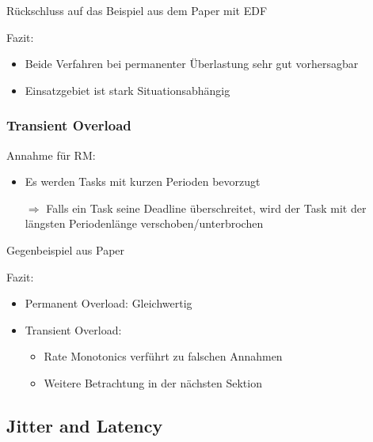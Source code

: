\begin{frame}{\subsubsecname}
	Rückschluss auf das Beispiel aus dem Paper mit EDF
\end{frame}

\begin{frame}{\subsubsecname}
	Fazit:
	\begin{itemize}
		\item Beide Verfahren bei permanenter Überlastung sehr gut vorhersagbar
		\item Einsatzgebiet ist stark Situationsabhängig
	\end{itemize}
\end{frame}

\subsubsection{Transient Overload}
\begin{frame}{\subsubsecname}
	Annahme für RM:
	\begin{itemize}
		\item Es werden Tasks mit kurzen Perioden bevorzugt\pause
		\item[$\Rightarrow$] Falls ein Task seine Deadline überschreitet, wird der Task mit der längsten Periodenlänge verschoben/unterbrochen	
	\end{itemize}
\end{frame}

\begin{frame}{\subsubsecname}
	Gegenbeispiel aus Paper
\end{frame}

\begin{frame}{\subsubsecname}
	
\end{frame}

\begin{frame}{\subsecname}
	Fazit:
	\begin{itemize}
		\item Permanent Overload: Gleichwertig
		\item Transient Overload:
		\begin{itemize}
			\item Rate Monotonics verführt zu falschen Annahmen
			\item Weitere Betrachtung in der nächsten Sektion
		\end{itemize}
	\end{itemize}
\end{frame}

\subsection{Jitter and Latency}

